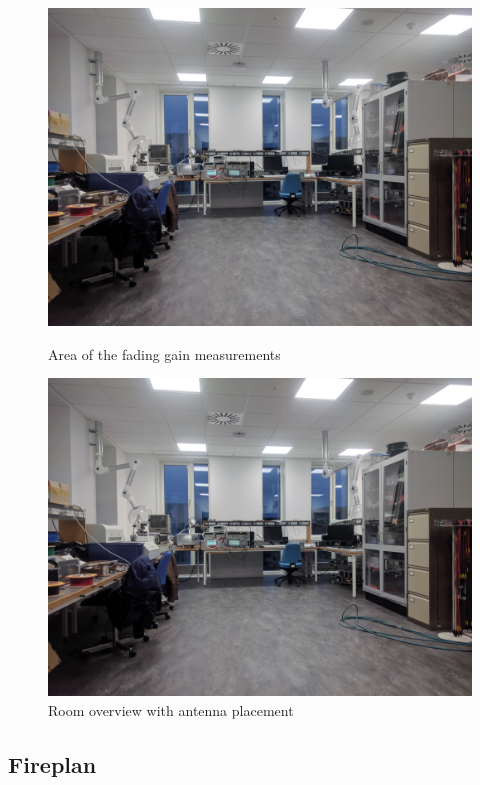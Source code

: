 \begin{figure}[H]
  \centering
  \begin{minipage}[H]{0.4\textwidth}
    \includegraphics[width=\textwidth]{pictures/Measurement/walking_meas.jpg}
    \caption{Area of the fading gain measurements}
  \end{minipage}
  \hfill
  \begin{minipage}[H]{0.4\textwidth}
    \includegraphics[width=\textwidth]{pictures/Measurement/walking_meas.jpg}
    \caption{Room overview with antenna placement}
  \end{minipage}
\end{figure}
\subsection{Fireplan}

